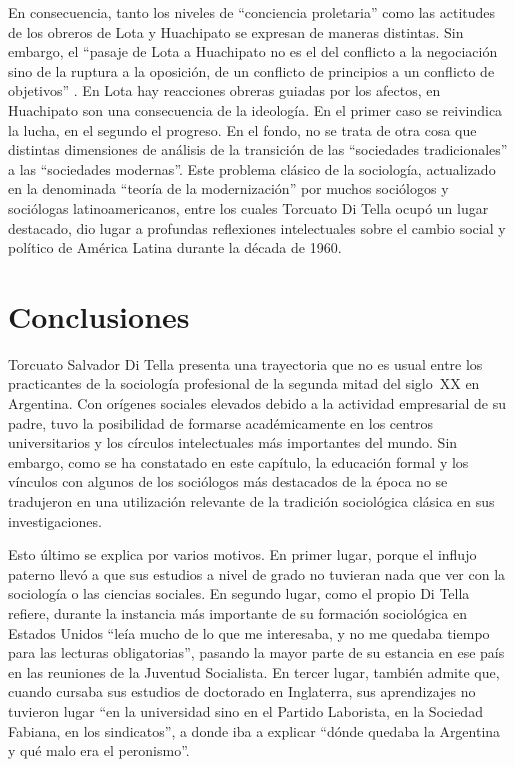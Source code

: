 En consecuencia, tanto los niveles de \enquote{conciencia proletaria} como las actitudes de los obreros de Lota y Huachipato se expresan de maneras distintas. Sin embargo, el \enquote{pasaje de Lota a Huachipato no es el del conflicto a la negociación sino de la ruptura a la oposición, de un conflicto de principios a un conflicto de objetivos} \parencite[325]{1651-DITELLA1967}. En Lota hay reacciones obreras guiadas por los afectos, en Huachipato son una consecuencia de la ideología. En el primer caso se reivindica la lucha, en el segundo el progreso. En el fondo, no se trata de otra cosa que distintas dimensiones de análisis de la transición de las \enquote{sociedades tradicionales} a las \enquote{sociedades modernas}. Este problema clásico de la sociología, actualizado en la denominada \enquote{teoría de la modernización} por muchos sociólogos y sociólogas latinoamericanos, entre los cuales Torcuato Di Tella ocupó un lugar destacado, dio lugar a profundas reflexiones intelectuales sobre el cambio social y político de América Latina durante la década de 1960.

\section{Conclusiones}

Torcuato Salvador Di Tella presenta una trayectoria que no es usual entre los practicantes de la sociología profesional de la segunda mitad del siglo~XX en Argentina. Con orígenes sociales elevados debido a la actividad empresarial de su padre, tuvo la posibilidad de formarse académicamente en los centros universitarios y los círculos intelectuales más importantes del mundo. Sin embargo, como se ha constatado en este capítulo, la educación formal y los vínculos con algunos de los sociólogos más destacados de la época no se tradujeron en una utilización relevante de la tradición sociológica clásica en sus investigaciones.

Esto último se explica por varios motivos. En primer lugar, porque el influjo paterno llevó a que sus estudios a nivel de grado no tuvieran nada que ver con la sociología o las ciencias sociales. En segundo lugar, como el propio Di Tella refiere, durante la instancia más importante de su formación sociológica en Estados Unidos \enquote{leía mucho de lo que me interesaba, y no me quedaba tiempo para las lecturas obligatorias}, pasando la mayor parte de su estancia en ese país en las reuniones de la Juventud Socialista. En tercer lugar, también admite que, cuando cursaba sus estudios de doctorado en Inglaterra, sus aprendizajes no tuvieron lugar \enquote{en la universidad sino en el Partido Laborista, en la Sociedad Fabiana, en los sindicatos}, a donde iba a explicar \enquote{dónde quedaba la Argentina y qué malo era el peronismo}.

